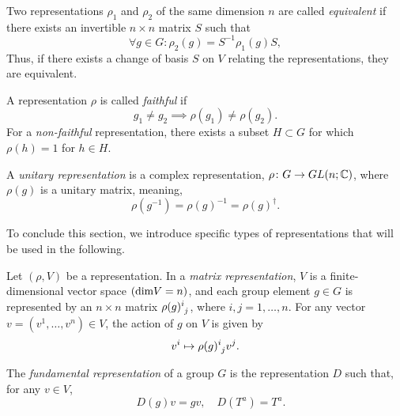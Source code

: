 \begin{definition}
    Two representations $\rho_1$ and $\rho_2$ of the same dimension $n$ are called \emph{equivalent} if there exists an invertible $n \times n$ matrix $S$ such that
    \begin{equation}
         \forall g \in G: \rho_2(g) = S^{-1} \rho_1(g) S,
    \end{equation}
    Thus, if there exists a change of basis $S$ on $V$ relating the representations, they are equivalent.
\end{definition}

\begin{definition}
    A representation $\rho$ is called \emph{faithful} if 
\begin{equation}
    g_1 \neq g_2 \implies \rho(g_1) \neq \rho(g_2) .
\end{equation}
For a \emph{non-faithful} representation, there exists a subset $H \subset G$ for which $\rho(h) = 1$ for $h \in H$.
\end{definition}

\begin{definition}
    A \emph{unitary representation} is a complex representation, $\rho \colon G \to GL(n;\mathbb{C})$, where $\rho(g)$ is a unitary matrix, meaning,
\begin{equation}
    \rho(g^{-1}) = {\rho(g)}^{-1} = {\rho(g)}^\dagger .
\end{equation}
\end{definition}


To conclude this section, we introduce specific types of representations that will be used in the following.

\begin{definition}
    Let $(\rho, V)$ be a representation. In a \emph{matrix representation}, $V$ is a finite-dimensional vector space $(\textup{dim} V = n)$, and each group element $g \in G$ is represented by an $n \times n$ matrix $\tensor{\rho(g)}{^i_j}$, where $i,j = 1, \dots, n$. For any vector $v = (v^1, \dots, v^n) \in V$, the action of $g$ on $V$ is given by
    \begin{equation}
        v^i \mapsto \tensor{\rho(g)}{^i_j} v^j .
    \end{equation}
\end{definition}

\begin{definition}
    The \emph{fundamental representation} of a group $G$ is the representation $D$ such that, for any $v \in V$,
    \begin{equation}
        \quad D(g) v = g v, \quad D(T^a) = T^a.
    \end{equation}
\end{definition}

